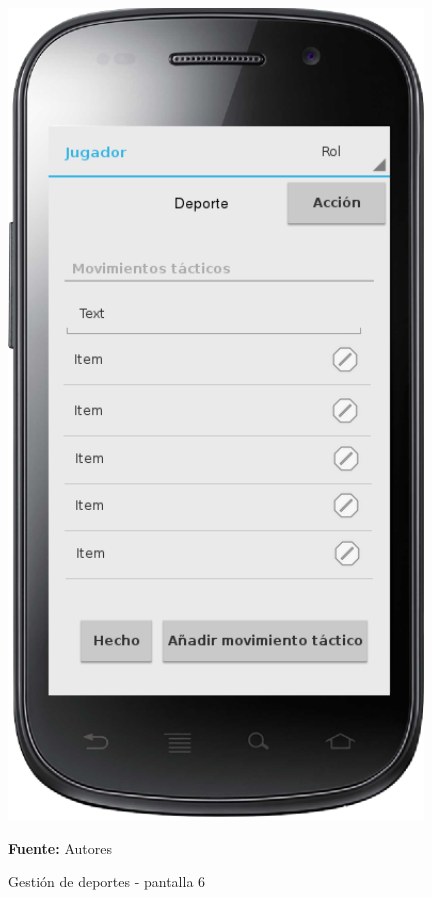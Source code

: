 \begin{figure}[!htb]
  \begin{center}
    \includegraphics[width=11cm]{./imagenes/UI/Deportes/gestion_deportes_6.png}
    \caption{Gestión de deportes - pantalla 6}
    \label{fig:gestion_deportes_6}
    \textbf{Fuente:}  Autores
  \end{center}
\end{figure}

